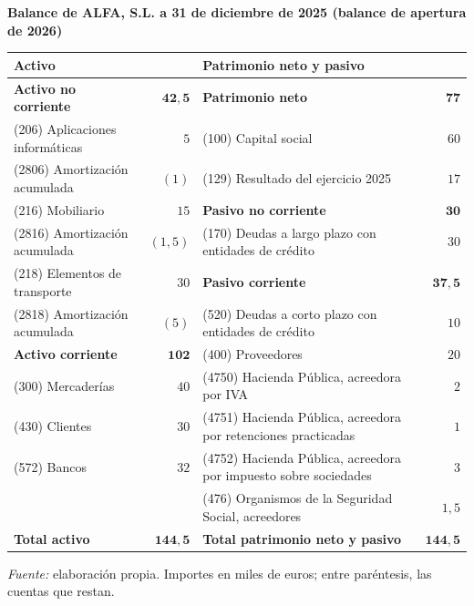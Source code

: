 \documentclass[10pt,a4paper]{article}
\begin{document}
\begin{center}\begin{minipage}{\linewidth}\centering
{\small\textbf{Balance de ALFA, S.L. a 31 de diciembre de 2025 (balance de apertura de 2026)}}\par\vspace{0.3em}
{\small
\begin{tabular}{p{5.6cm} r | p{5.6cm} r}
\hline
\textbf{Activo} & & \textbf{Patrimonio neto y pasivo} & \\
\hline
\textbf{Activo no corriente} & $\mathbf{42,5}$ & \textbf{Patrimonio neto} & $\mathbf{77}$ \\
(206) Aplicaciones informáticas & $5$ & (100) Capital social & $60$ \\
(2806) Amortización acumulada & $(1)$ & (129) Resultado del ejercicio 2025 & $17$ \\
(216) Mobiliario & $15$ & \textbf{Pasivo no corriente} & $\mathbf{30}$ \\
(2816) Amortización acumulada & $(1,5)$ & \raggedright (170) Deudas a largo plazo con entidades de crédito & $30$ \\
(218) Elementos de transporte & $30$ & \textbf{Pasivo corriente} & $\mathbf{37,5}$ \\
(2818) Amortización acumulada & $(5)$ & \raggedright (520) Deudas a corto plazo con entidades de crédito & $10$ \\
\textbf{Activo corriente} & $\mathbf{102}$ & (400) Proveedores & $20$ \\
(300) Mercaderías & $40$ & (4750) Hacienda Pública, acreedora por IVA & $2$ \\
(430) Clientes & $30$ & \raggedright (4751) Hacienda Pública, acreedora por retenciones practicadas & $1$ \\
(572) Bancos & $32$ & \raggedright (4752) Hacienda Pública, acreedora por impuesto sobre sociedades & $3$ \\
 & & \raggedright (476) Organismos de la Seguridad Social, acreedores & $1,5$ \\
\hline
\textbf{Total activo} & $\mathbf{144,5}$ & \textbf{Total patrimonio neto y pasivo} & $\mathbf{144,5}$ \\
\hline
\end{tabular}}\par\vspace{0.3em}
{\small\textit{Fuente: }elaboración propia. Importes en miles de euros; entre paréntesis, las cuentas que restan.}
\end{minipage}\end{center}
\end{document}
